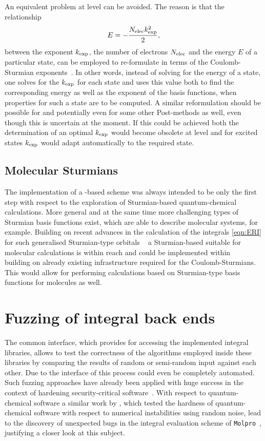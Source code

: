 \noindent
An equivalent problem at \FCI level can be avoided.
The reason is that the relationship
\[ E = - \frac{N_\text{elec} k_\text{exp}^2}{2}, \]
between the \CS exponent $k_\text{exp}$, the number of electrons $N_\text{elec}$
and the energy $E$ of a particular state,
can be employed to re-formulate \FCI in terms of the
Coulomb-Sturmian exponents~\cite{Avery2006}.
In other words, instead of solving for the energy of a state,
one solves for the $k_\text{exp}$ for each state
and uses this value both to find the corresponding energy
as well as the exponent of the basis functions,
when properties for such a state are to be computed.
A similar reformulation should be possible for \HF
and potentially even for some other Post-\HF methods as well,
even though this is uncertain at the moment.
If this could be achieved both the determination of an optimal
$k_\text{exp}$ would become obsolete at \HF level
and for excited states $k_\text{exp}$ would adapt automatically to the required state.

\subsection{Molecular Sturmians}
\label{sec:MolecularSturmian}
The implementation of a \CS-based \SCF scheme was always intended
to be only the first step with respect to the exploration
of Sturmian-based quantum-chemical calculations.
More general and at the same time more challenging types of Sturmian basis
functions exist,
which are able to describe molecular systems, for example.
Building on recent advances in the calculation of the \ERI integrals
\eqref{eqn:ERI} for such generalised Sturmian-type orbitals%
~\cite{Avery2006,Avery2011PhD,Avery2011,Morales2016,Avery2017,Randazzo2015,Granados2016}
a Sturmian-based \HF suitable for molecular calculations is within reach
and could be implemented within \sturmint~\cite{sturmintWeb}
building on already existing infrastructure required for the Coulomb-Sturmians.
This would allow for performing calculations
based on Sturmian-type basis functions for molecules as well.


%
%
\section{Fuzzing of integral back ends}
\label{sec:Fuzzing}
The common interface, which \molsturm provides
for accessing the implemented integral libraries,
allows to test the correctness
of the algorithms employed inside these libraries
by comparing the results of
random or semi-random input against each other.
Due to the \python interface of \molsturm this process could
even be completely automated.
Such fuzzing approaches have already been applied with huge success
in the context of hardening security-critical software~\cite{Fuzzing}.
With respect to quantum-chemical software
a similar work by \citet{Knizia2011},
which tested the hardness of quantum-chemical software
with respect to numerical instabilities using random noise,
lead to the discovery of unexpected bugs
in the integral evaluation scheme of \texttt{Molpro}~\cite{Molpro},
justifying a closer look at this subject.

